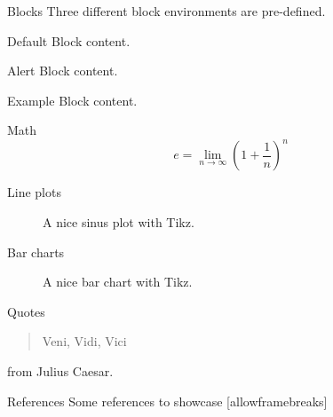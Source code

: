 \documentclass[aspectratio=169]{beamer}
\begin{document}
	
	\begin{frame}{Blocks}
		Three different block environments are pre-defined.
		
		\begin{block}{Default}
  Block content.
		\end{block}
		
		\begin{alertblock}{Alert}
  Block content.
		\end{alertblock}
		
		\begin{exampleblock}{Example}
  Block content.
		\end{exampleblock}
	\end{frame}
	
	\begin{frame}{Math}
		\begin{equation}
			e = \lim_{n\to \infty} \left(1 + \frac{1}{n}\right)^n
		\end{equation}
	\end{frame}
	
	\begin{frame}{Line plots}
		\begin{figure}
			\centering
			\caption{A nice sinus plot with Tikz.}
		\end{figure}
	\end{frame}
	
	\begin{frame}{Bar charts}
		\begin{figure}
			\centering
			\caption{A nice bar chart with Tikz.}
		\end{figure}
	\end{frame}
	
	\begin{frame}{Quotes}
		\begin{quote}
			Veni, Vidi, Vici
		\end{quote}
		from Julius Caesar.
	\end{frame}
		
	\begin{frame}{References}
		Some references to showcase [allowframebreaks] \cite{Knuth92,ConcreteMath,Simpson,Er01,greenwade93}
	\end{frame}


\addtocounter{levelstanda}{-1}
\end{document}

